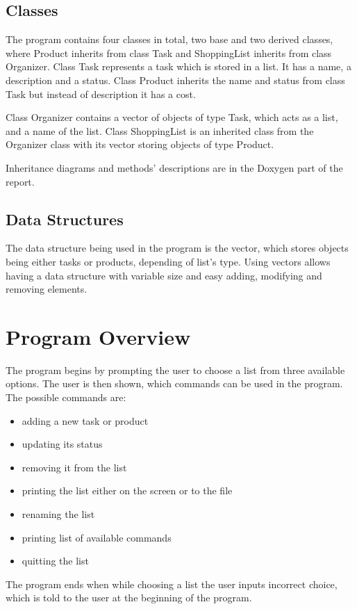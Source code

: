 \documentclass{article}
\begin{document}
\subsection{Classes}

The program contains four classes in total, two base and two derived classes, where Product inherits from class Task and ShoppingList inherits from class Organizer. 
Class Task represents a task which is stored in a list. It has a name, a description and a status. Class Product inherits the name and status from class Task but instead of description it has a cost.

Class Organizer contains a vector of objects of type Task, which acts as a list, and a name of the list. Class ShoppingList is an inherited class from the Organizer class with its vector storing objects of type Product.

Inheritance diagrams and methods' descriptions are in the Doxygen part of the report.

\subsection{Data Structures}

The data structure being used in the program is the vector, which stores objects being either tasks or products, depending of list's type. Using vectors allows having a data structure with variable size and easy adding, modifying and removing elements.  

\vfill

\section{Program Overview}

The program begins by prompting the user to choose a list from three available options. The user is then shown, which commands can be used in the program. The possible commands are:
\begin{itemize}
\item adding a new task or product
\item updating its status
\item removing it from the list
\item printing the list either on the screen or to the file
\item renaming the list
\item printing list of available commands
\item quitting the list
\end{itemize}
The program ends when while choosing a list the user inputs incorrect choice, which is told to the user at the beginning of the program.
\end{document}
